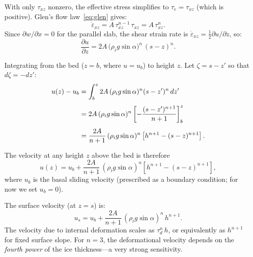 \documentclass[11pt]{article}
\begin{document}
\begin{tcolorbox}[
  colback=orange!25,
  colframe=orange!70!black,
  title={\textbf{Derivation: Velocity Profile for Simple Shear}},
  breakable
]
With only $\tau_{xz}$ nonzero, the effective stress simplifies to $\tau_e = \tau_{xz}$ (which is positive).  Glen's flow law~\eqref{eq:glen} gives:
\begin{equation}
  \dot{\varepsilon}_{xz} = A\,\tau_{xz}^{n-1}\,\tau_{xz} = A\,\tau_{xz}^n.
\end{equation}
Since $\partial w/\partial x = 0$ for the parallel slab, the shear strain rate is $\dot{\varepsilon}_{xz} = \frac{1}{2}\partial u/\partial z$, so:
\begin{equation}
  \frac{\partial u}{\partial z} = 2A\,\bigl(\rho_i g \sin\alpha\bigr)^n\,(s - z)^n.
  \label{eq:dudzraw}
\end{equation}

\noindent Integrating from the bed ($z = b$, where $u = u_b$) to height $z$.  Let $\zeta = s - z'$ so that $d\zeta = -dz'$:
\begin{align}
  u(z) - u_b &= \int_b^z 2A\,(\rho_i g \sin\alpha)^n (s - z')^n\,dz' \notag\\[4pt]
  &= 2A\,(\rho_i g \sin\alpha)^n \left[-\frac{(s-z')^{n+1}}{n+1}\right]_b^z \notag\\[4pt]
  &= \frac{2A}{n+1}\,(\rho_i g \sin\alpha)^n \left[h^{n+1} - (s - z)^{n+1}\right].
\end{align}

\medskip
\noindent The velocity at any height $z$ above the bed is therefore
\begin{equation}
  \boxed{u(z) = u_b + \frac{2A}{n+1}\,(\rho_i g \sin\alpha)^n \left[h^{n+1} - (s - z)^{n+1}\right],}
  \label{eq:velocity_profile}
\end{equation}
where $u_b$ is the basal sliding velocity (prescribed as a boundary condition; for now we set $u_b = 0$).

\medskip
\noindent The surface velocity (at $z = s$) is:
\begin{equation}
  u_s = u_b + \frac{2A}{n+1}\,(\rho_i g \sin\alpha)^n\,h^{n+1}.
  \label{eq:surface_vel}
\end{equation}
The velocity due to internal deformation scales as $\tau_d^n\,h$, or equivalently as $h^{n+1}$ for fixed surface slope.  For $n = 3$, the deformational velocity depends on the \emph{fourth power} of the ice thickness---a very strong sensitivity.
\end{tcolorbox}
\end{document}
